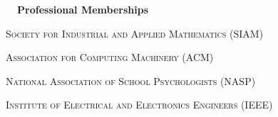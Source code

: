\documentclass[hidelinks, 10pt]{article}
\begin{document}
{\vspace{7mm}


{\fontsize{14}{14}\selectfont \textbf{\ \ Professional Memberships\ \ }}\hrulefill

\vspace{3mm}

\begin{minipage}[ct]{0.9\linewidth}
    \textsc{Society for Industrial and Applied Mathematics} (SIAM)
\end{minipage}

\vspace{0.5mm}

\begin{minipage}[ct]{0.9\linewidth}
    \textsc{Association for Computing Machinery} (ACM)
\end{minipage}

\vspace{0.5mm}

\begin{minipage}[ct]{0.9\linewidth}
    \textsc{National Association of School Psychologists} (NASP)
\end{minipage}

\vspace{0.5mm}

\begin{minipage}[ct]{0.9\linewidth}
    \textsc{Institute of Electrical and Electronics Engineers} (IEEE)
\end{minipage}

\vspace{-2mm}



}
\end{document}
